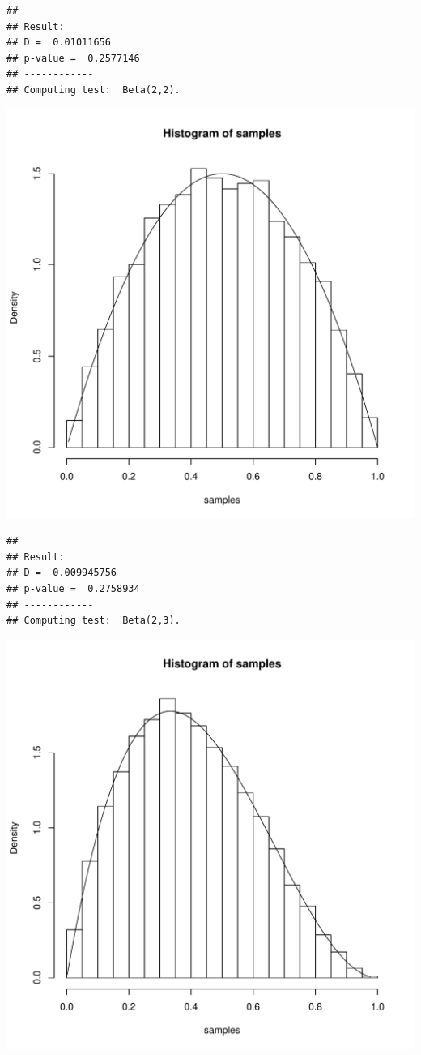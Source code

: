\documentclass{llncs}\usepackage[]{graphicx}\usepackage[]{color}
\makeatletter
\def\maxwidth{ %
  \ifdim\Gin@nat@width>\linewidth
    \linewidth
  \else
    \Gin@nat@width
  \fi
}
\newenvironment{kframe}{%
 \def\at@end@of@kframe{}%
 \ifinner\ifhmode%
  \def\at@end@of@kframe{\end{minipage}}%
  \begin{minipage}{\columnwidth}%
 \fi\fi%
 \def\FrameCommand##1{\hskip\@totalleftmargin \hskip-\fboxsep
 \colorbox{shadecolor}{##1}\hskip-\fboxsep
     \hskip-\linewidth \hskip-\@totalleftmargin \hskip\columnwidth}%
 \MakeFramed {\advance\hsize-\width
   \@totalleftmargin\z@ \linewidth\hsize
   \@setminipage}}%
 {\par\unskip\endMakeFramed%
 \at@end@of@kframe}
\newenvironment{knitrout}{}{} %
\makeatother
\begin{document}
\begin{knitrout}
\begin{kframe}
\begin{lstlisting}[basicstyle=\ttfamily,breaklines=true]
## 
## Result:
## D =  0.01011656 
## p-value =  0.2577146 
## ------------
## Computing test:  Beta(2,2).
\end{lstlisting}
\end{kframe}
\includegraphics[width=\maxwidth]{figure/Rt-2} 
\begin{kframe}\begin{lstlisting}[basicstyle=\ttfamily,breaklines=true]
## 
## Result:
## D =  0.009945756 
## p-value =  0.2758934 
## ------------
## Computing test:  Beta(2,3).
\end{lstlisting}
\end{kframe}
\includegraphics[width=\maxwidth]{figure/Rt-3} 

\end{knitrout}
\end{document}
